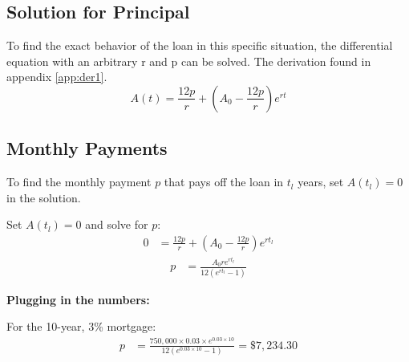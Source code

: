 \documentclass{article}
\numberwithin{figure}{section}
\begin{document}
    \subsection{Solution for Principal}
    To find the exact behavior of the loan in this specific situation, the differential equation with an arbitrary r and p can be solved. The derivation found in appendix \ref{app:der1}.
    \begin{equation*}
        A(t) = \frac{12p}{r} + \left( A_0 - \frac{12p}{r} \right ) e^{rt}
    \end{equation*}

    \subsection{Monthly Payments}
    
        To find the monthly payment $p$ that pays off the loan in $t_l$ years, set $A(t_l) = 0$ in the solution. 
        
        Set $A(t_l) = 0$ and solve for $p$:
        \begin{align*}
            0 &= \frac{12p}{r} + \left( A_0 - \frac{12p}{r} \right ) e^{r t_l} 
        \end{align*}
        \begin{align*}
            p &= \frac{A_0 r e^{r t_l}}{12 (e^{r t_l} - 1)}
        \end{align*}
        
        \textbf{Plugging in the numbers:}
        
        For the 10-year, 3\% mortgage:
        \begin{align*}
            p &= \frac{750{,}000 \times 0.03 \times e^{0.03 \times 10}}{12 (e^{0.03 \times 10} - 1)} = \$7{,}234.30
        \end{align*}
            
\end{document}
